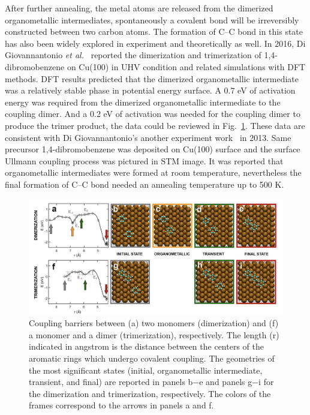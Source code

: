 \documentclass[%
 reprint,
 amsmath,amssymb,
 aps,
prb,
]{revtex4-2}
\begin{document}
After further annealing, the metal atoms are released from the dimerized organometallic intermediates, spontaneously a covalent bond will be irreversibly constructed between two carbon atoms. The formation of C--C bond in this state has also been widely explored in experiment and theoretically as well. In 2016, Di Giovannantonio \textit{et al.}~\cite{jacs2016} reported the dimerization and trimerization of 1,4-dibromobenzene on Cu(100) in UHV condition and related simulations with DFT methods. DFT results predicted that the dimerized organometallic intermediate was a relatively stable phase in potential energy surface. A 0.7 eV of activation energy was required from the dimerized organometallic intermediate to the coupling dimer. And a 0.2 eV of activation was needed for the coupling dimer to produce the trimer product, the data could be reviewed in Fig.~\ref{fig:dimer}. These data are consistent with Di Giovannantonio's another experiment work~\cite{acsnano2013} in 2013. Same precursor 1,4-dibromobenzene was deposited on Cu(100) surface and the surface Ullmann coupling process was pictured in STM image. It was reported that organometallic intermediates were formed at room temperature, nevertheless the final formation of C--C bond needed an annealing temperature up to 500 K.
%
\begin{figure}[ht]
\centering
\includegraphics[width=1.0\textwidth]{Fig/Dimer_trimer.png}
\caption{Coupling barriers between (a) two monomers (dimerization) and (f) a monomer and a dimer (trimerization), respectively. The length (r) indicated in angstrom is the distance between the centers of the aromatic rings which undergo covalent coupling. The geometries of the most significant states (initial, organometallic intermediate, transient, and final) are reported in panels b−e and panels g−i for the dimerization and trimerization, respectively. The colors of the frames correspond to the arrows in panels a and f.}
\label{fig:dimer}
\end{figure}
%
\end{document}
